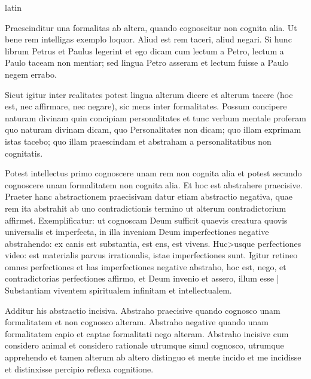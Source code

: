 \begin{otherlanguage*}{latin}
        \pstart
        \pend
      
\pstart
 Praescinditur una formalitas ab altera, quando cognoscitur non cognita alia. Ut bene rem intelligas exemplo loquor. Aliud est rem taceri, aliud negari. Si hunc librum Petrus et Paulus legerint et ego dicam cum lectum a Petro, lectum a Paulo taceam non mentiar; sed lingua Petro asseram et lectum fuisse a Paulo negem errabo. 
\pend

\pstart
 Sicut igitur inter realitates potest lingua alterum dicere et alterum tacere (hoc est, nec affirmare, nec negare), sic mens inter formalitates. Possum concipere naturam divinam quin concipiam personalitates et tunc verbum mentale proferam quo naturam divinam dicam, quo Personalitates non dicam; quo illam exprimam istas tacebo; quo illam praescindam et abstraham a personalitatibus non cognitatis. 
\pend

\pstart
 Potest intellectus primo cognoscere unam rem non cognita alia et potest secundo cognoscere unam formalitatem non cognita alia. Et hoc est abstrahere praecisive. Praeter hanc abstractionem praecisivam datur etiam abstractio negativa, quae rem ita abstrahit ab uno contradictionis termino ut alterum contradictorium affirmet. Exemplificatur: ut cognoscam Deum sufficit quaevis creatura quovis universalis et imperfecta, in illa inveniam Deum imperfectiones negative abstrahendo: ex canis est substantia, est ens, est vivens. Huc>usque perfectiones video: est materialis parvus irrationalis, istae imperfectiones sunt. Igitur retineo omnes perfectiones et has imperfectiones negative abstraho, hoc est, nego, et contradictorias perfectiones affirmo, et Deum invenio et assero, illum esse \textnormal{|}  Substantiam viventem spiritualem infinitam et intellectualem. 
\pend

\pstart
 Additur his abstractio incisiva. Abstraho praecisive quando cognosco unam formalitatem et non cognosco alteram. Abstraho negative quando unam formalitatem capio et captae formalitati nego alteram. Abstraho incisive cum considero animal et considero rationale utrumque simul cognosco, utrumque apprehendo et tamen alterum ab altero distinguo et mente incido et me incidisse et distinxisse percipio reflexa cognitione. 
\pend


\end{otherlanguage*}
